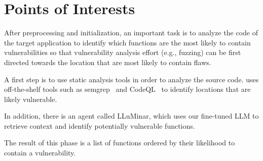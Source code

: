 \section{Points of Interests}
\label{pointsofinterests}

After preprocessing and initialization, an important task is to analyze the code of the target application to identify which functions are the most likely to contain vulnerabilities so that vulnerability analysis effort (e.g., fuzzing) can be first directed towards the location that are most likely to contain flaws.

A first step is to use static analysis tools in order to analyze the source code.
\artiphishell uses off-the-shelf tools such as semgrep~\cite{semgrep} and CodeQL~\cite{codeql} to identify locations that are likely vulnerable.

In addition, there is an agent called LLuMinar, which uses our fine-tuned LLM to retrieve context and identify potentially vulnerable functions.

The result of this phase is a list of functions ordered by their likelihood to contain a vulnerability.




